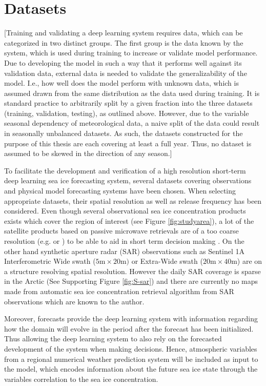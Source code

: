 \documentclass[../main/thesis.tex]{subfiles}
\begin{document}
\section{Datasets}
[Training and validating a deep learning system requires data, which can be categorized in two distinct groups. The first group is the data known by the system, which is used during training to increase or validate model performance. Due to developing the model in such a way that it performs well against its validation data, external data is needed to validate the generalizability of the model. I.e., how well does the model perform with unknown data, which is assumed drawn from the same distribution as the data used during training. It is standard practice to arbitrarily split by a given fraction into the three datasets (training, validation, testing), as outlined above. However, due to the variable seasonal dependency of meteorological data, a naive split of the data could result in seasonally unbalanced datasets. As such, the datasets constructed for the purpose of this thesis are each covering at least a full year. Thus, no dataset is assumed to be skewed in the direction of any season.] 

To facilitate the development and verification of a high resolution short-term deep learning sea ice forecasting system, several datasets covering observations and physical model forecasting systems have been chosen. When selecting appropriate datasets, their spatial resolution as well as release frequency has been considered. Even though several observational sea ice concentration products exists which cover the region of interest (see Figure \ref{fig:studyarea}), a lot of the satellite products based on passive microwave retrievals are of a too coarse resolution (e.g. \citet{Lavergne2019} or \citet{Kern2019}) to be able to aid in short term decision making \citep{Wagner2020}. On the other hand synthetic aperture radar (SAR) observations such as Sentinel 1A Interferometric Wide swath ($5\text{m} \times 20\text{m})$ or Extra-Wide swath ($20\text{m} \times 40\text{m}$) are on a structure resolving spatial resolution. However the daily SAR coverage is sparse in the Arctic (See Supporting Figure \ref{fig:S-sar}) and there are currently no maps made from automatic sea ice concentration retrieval algorithm from SAR observations which are known to the author.

Moreover, forecasts provide the deep learning system with information regarding how the domain will evolve in the period after the forecast has been initialized. Thus allowing the deep learning system to also rely on the forecasted development of the system when making decisions. Hence, atmospheric variables from a regional numerical weather prediction system will be included as input to the model, which encodes information about the future sea ice state through the variables correlation to the sea ice concentration.
\end{document}
